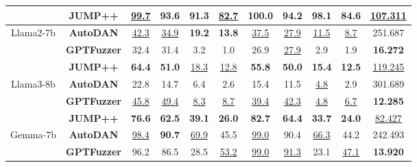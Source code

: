 \begin{table*}[!t]
\begin{tabular}{ccccccccccc}
            & \textbf{JUMP++} & \underline{99.7} & 93.6 & \textbf{91.3} & \underline{82.7} & \textbf{100.0} & 94.2 & \textbf{98.1} & \textbf{84.6} & \underline{107.311} \\
        \hline
        \multirow{3}{*}{Llama2-7b} 
            & \textbf{AutoDAN} & \underline{42.3} & \underline{34.9} & \textbf{19.2} & \textbf{13.8} & \underline{37.5} & \underline{27.9} & \underline{11.5} & \underline{8.7} & 251.687 \\
            & \textbf{GPTFuzzer} & 32.4 & 31.4 & 3.2 & 1.0 & 26.9 & \underline{27.9} & 2.9 & 1.9 & \textbf{16.272} \\
            & \textbf{JUMP++} & \textbf{64.4} & \textbf{51.0} & \underline{18.3} & \underline{12.8} & \textbf{55.8} & \textbf{50.0} & \textbf{15.4} & \textbf{12.5} & \underline{119.245} \\ 
        \hline
        \multirow{3}{*}{Llama3-8b} 
            & \textbf{AutoDAN} & 22.8 & 14.7 & 6.4 & 2.6 & 15.4 & 11.5 & \underline{4.8} & 2.9 & 301.689 \\
            & \textbf{GPTFuzzer} & \underline{45.8} & \underline{49.4} & \underline{8.3} & \underline{8.7} & \underline{39.4} & \underline{42.3} & \underline{4.8} & \underline{6.7} & \textbf{12.285} \\
            & \textbf{JUMP++} & \textbf{76.6} & \textbf{62.5} & \textbf{39.1} & \textbf{26.0} & \textbf{82.7} & \textbf{64.4} & \textbf{33.7} & \textbf{24.0} & \underline{82.427} \\
        \hline
        \multirow{3}{*}{Gemma-7b} 
            & \textbf{AutoDAN} & \underline{98.4} & \textbf{90.7} & \underline{69.9} & 45.5 & \underline{99.0} & 90.4 & \underline{66.3} & 44.2 & 242.493 \\
            & \textbf{GPTFuzzer} & 96.2 & 86.5 & 28.5 & \underline{53.2} & \underline{99.0} & \underline{91.3} & 23.1 & \underline{47.1} & \textbf{13.920} \\

\end{tabular}
\end{table*}
